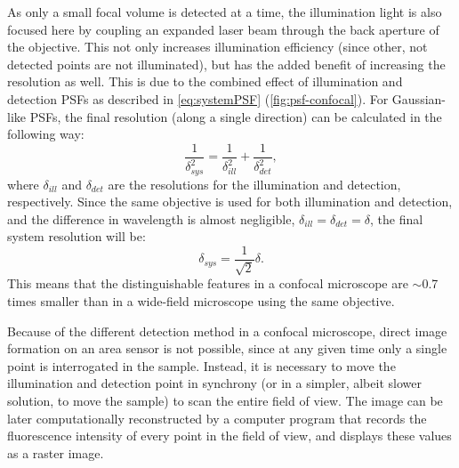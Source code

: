     As only a small focal volume is detected at a time, the illumination light is also focused here by coupling an expanded laser beam through the back aperture of the objective. This not only increases illumination efficiency (since other, not detected points are not illuminated), but has the added benefit of increasing the resolution as well. This is due to the combined effect of illumination and detection PSFs as described in \autoref{eq:systemPSF} (\autoref{fig:psf-confocal}). For Gaussian-like PSFs, the final resolution (along a single direction) can be calculated in the following way:
    \begin{equation}
      \frac{1}{\delta _{sys}^2} = \frac{1}{\delta _{ill}^2} + \frac{1}{\delta _{det}^2},
      \label{eq:systemRes}
    \end{equation}
    where $\delta_{ill}$ and $\delta_{det}$ are the resolutions for the illumination and detection, respectively. Since the same objective is used for both illumination and detection, and the difference in wavelength is almost negligible, $\delta_{ill} = \delta_{det} = \delta$, the final system resolution will be:
    \begin{equation}
      \delta_{sys} = \frac{1}{\sqrt{2}} \delta.
    \end{equation}
    This means that the distinguishable features in a confocal microscope are $\sim$0.7 times smaller than in a wide-field microscope using the same objective.

    Because of the different detection method in a confocal microscope, direct image formation on an area sensor is not possible, since at any given time only a single point is interrogated in the sample. Instead, it is necessary to move the illumination and detection point in synchrony (or in a simpler, albeit slower solution, to move the sample) to scan the entire field of view. The image can be later computationally reconstructed by a computer program that records the fluorescence intensity of every point in the field of view, and displays these values as a raster image.


